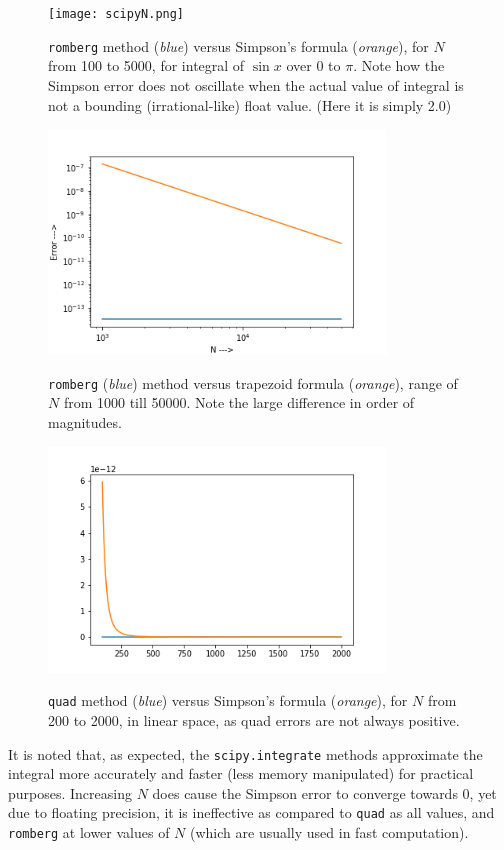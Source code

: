 \documentclass{report}
\begin{document}
\begin{figure}[H]
	\centering
	\texttt{[image: scipyN.png]}
	\label{scipy3.5}
	\caption{\texttt{romberg} method (\emph{blue}) versus Simpson's formula (\emph{orange}), for $N$ from 100 to 5000, for integral of $\sin x$ over 0 to $\pi$. Note how the Simpson error does not oscillate when the actual value of integral is not a bounding (irrational-like) float value. (Here it is simply 2.0)}
\end{figure}
\begin{figure}[H]
	\centering
	\includegraphics[width = 0.8\textwidth]{scipy4.png}
	\label{scipy4}
	\caption{\texttt{romberg} (\emph{blue}) method versus trapezoid formula (\emph{orange}), range of $N$ from 1000 till 50000. Note the large difference in order of magnitudes.}
\end{figure}
\begin{figure}[H]
	\centering
	\includegraphics[width = 0.8\textwidth]{scipy5.png}
	\label{scipy5}
	\caption{\texttt{quad} method (\emph{blue}) versus Simpson's formula (\emph{orange}), for $N$ from 200 to 2000, in linear space, as quad errors are not always positive.}
\end{figure}
It is noted that, as expected, the \texttt{scipy.integrate} methods approximate the integral more accurately and faster (less memory manipulated) for practical purposes. Increasing $N$ does cause the Simpson error to converge towards 0, yet due to floating precision, it is ineffective as compared to \texttt{quad} as all values, and \texttt{romberg} at lower values of $N$ (which are usually used in fast computation).
\end{document}
